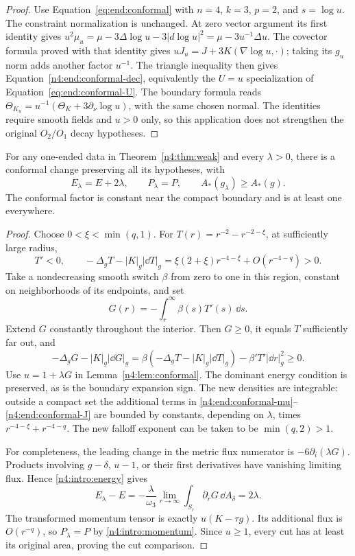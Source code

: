 \begin{proof}
Use Equation~\eqref{eq:end:conformal} with $n=4$, $k=3$, $p=2$,
and $s=\log u$. The constraint normalization is unchanged. At zero
vector argument its first identity gives
$u^2\mu_u=\mu-3\Delta\log u-3|d\log u|^2
=\mu-3u^{-1}\Delta u$.
The covector formula proved with that identity gives
$uJ_u=J+3K(\nabla\log u,\cdot)$; taking its $g_u$ norm adds
another factor $u^{-1}$. The triangle inequality then gives
Equation~\eqref{n4:end:conformal-dec}, equivalently the $U=u$
specialization of Equation~\eqref{eq:end:conformal-U}.
The boundary formula reads
$\Theta_{K_u}=u^{-1}(\Theta_K+3\partial_\nu\log u)$,
with the same chosen normal. The identities require smooth fields
and $u>0$ only, so this application does not strengthen the original
$O_2/O_1$ decay hypotheses.
\end{proof}

\begin{lemma}\label{n4:end:positive-shell}
For any one-ended data in Theorem~\ref{n4:thm:weak} and every \(\lambda>0\),
there is a conformal change preserving all its hypotheses, with
\[
 E_\lambda=E+2\lambda,\qquad P_\lambda=P,
 \qquad A_*(g_\lambda)\ge A_*(g).
\]
The conformal factor is constant near the compact boundary and is at
least one everywhere.
\end{lemma}

\begin{proof}
Choose \(0<\xi<\min(q,1)\). For
\(T(r)=r^{-2}-r^{-2-\xi}\), at sufficiently large radius,
\[
 T'<0,\qquad
 -\Delta_gT-|K|_g|\dd T|_g
 =\xi(2+\xi)r^{-4-\xi}+O(r^{-4-q})>0.
\]
Take a nondecreasing smooth switch \(\beta\) from zero to one in this
region, constant on neighborhoods of its endpoints, and set
\[
 G(r)=-\int_r^\infty\beta(s)T'(s)\,\dd s.
\]
Extend \(G\) constantly throughout the interior. Then \(G\ge0\), it
equals \(T\) sufficiently far out, and
\[
 -\Delta_gG-|K|_g|\dd G|_g
 =\beta(-\Delta_gT-|K|_g|\dd T|_g)
       -\beta'T'|\dd r|_g^2\ge0.
\]
Use \(u=1+\lambda G\) in Lemma~\ref{n4:lem:conformal}. The dominant
energy condition is preserved, as is the boundary expansion sign.
The new densities are integrable: outside a compact set the additional
terms in \eqref{n4:end:conformal-mu}--\eqref{n4:end:conformal-J} are bounded
by constants, depending on \(\lambda\), times
\(r^{-4-\xi}+r^{-4-q}\). The new falloff exponent can be taken to be
\(\min(q,2)>1\).

For completeness, the leading change in the metric flux numerator is
\(-6\partial_i(\lambda G)\). Products involving
\(g-\delta\), \(u-1\), or their first derivatives have vanishing
limiting flux. Hence \eqref{n4:intro:energy} gives
\[
 E_\lambda-E=-\frac{\lambda}{\omega_3}
       \lim_{r\to\infty}\int_{S_r}\partial_rG\,\dd A_\delta
       =2\lambda.
\]
The transformed momentum tensor is exactly \(u(K-\tau g)\). Its
additional flux is \(O(r^{-q})\), so \(P_\lambda=P\) by
\eqref{n4:intro:momentum}. Since \(u\ge1\), every cut has at least its
original area, proving the cut comparison.
\end{proof}


